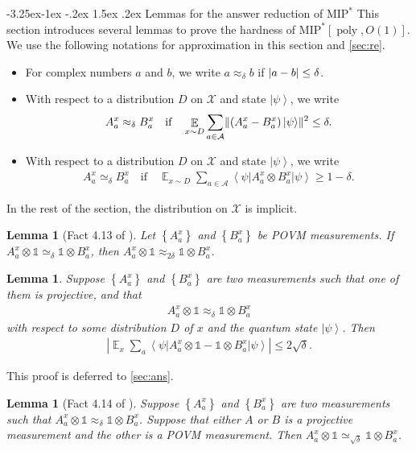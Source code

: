 \documentclass[11pt]{article}
\makeatletter
\renewcommand{\subsection}{\@startsection{subsection}{2}{\z@}%
             {-3.25ex\@plus -1ex \@minus -.2ex}%
             {1.5ex \@plus .2ex}%
             {\normalfont\large\scshape\bfseries}}
\theoremstyle{plain}
\newtheorem{lemma}[theorem]{Lemma}
\theoremstyle{definition}
\newcommand {\set} [1] {\ensuremath{ \left\lbrace #1 \right\rbrace }}
\DeclarePairedDelimiter{\norm}{\lVert}{\rVert}
\newcommand {\ab} [1] {\ensuremath{ \left| #1 \right| }}
\DeclarePairedDelimiter{\abs}{\lvert}{\rvert}
\newcommand {\bra} [1] {\ensuremath{ \left\langle #1 \right| }}
\newcommand {\ket} [1] {\ensuremath{ \left| #1 \right\rangle }}
\DeclareMathOperator*{\bigE}{\mathbb{E}}
\newcommand {\id} {\ensuremath{\mathds{1}}}
\newcommand{\poly} {\ensuremath{\operatorname{poly}}}
\newcommand{\x}{\otimes}
\newcommand{\calX}{\mathcal{X}}
\newcommand{\calA}{\mathcal{A}}
\newcommand{\appd}[1]{\approx_{#1}}
\newcommand{\1}{\mathbb{1}} %
\newcommand{\MIP}{\mathrm{MIP}}
\makeatother
\begin{document}
\subsection{Lemmas for the answer reduction of \texorpdfstring{$\MIP^\ast$}{MIP*}}
\label{sec:lemma_mip}
This section introduces several lemmas to prove the hardness of $\MIP^\ast[\poly,O(1)]$. 
We use the following notations for approximation in this section and \cref{sec:re}.
\begin{itemize}
\item For complex numbers $a$ and $b$, we write $a \appd{\delta} b$ if $\abs{a - b} \leq \delta$.
\item With respect to a distribution $D$ on $\calX$ and state $\ket{\psi}$, we write
\begin{align*}
	A^x_a \appd{\delta} B^x_a \quad \text{if} \quad \bigE_{x \sim D}\sum_{a \in \calA} \norm{ (A^x_a - B^x_a) \ket{\psi}}^2 \leq \delta.
\end{align*}
	\item With respect to a distribution $D$ on $\calX$ and state $\ket{\psi}$, we write
	\begin{align*}
		A^x_a \simeq_{\delta} B^x_a \quad \text{if} \quad \bigE_{x \sim D} \sum_{a \in \calA} \bra{\psi} A^x_a \x B^x_a \ket{\psi} \geq 1 - \delta.
	\end{align*}
\end{itemize}
In the rest of the section, the distribution on $\calX$ is implicit.
\begin{lemma}[Fact 4.13 of \cite{neexp}]
	\label{lm:consist_to_approx}
	Let $\set{A^x_a}$ and $\set{B^x_a}$ be POVM measurements.
	If $A^x_a \x \id \simeq_{\delta} \id \x B^x_a$, then $A^x_a \x \id \appd{2\delta} \id \x B^x_a$.
\end{lemma}
\begin{lemma} 
	\label{lm:close}
	Suppose $\set{A^x_a}$ and $\set{ B^x_a }$ are two measurements such that
	one of them is projective, and that 
	\begin{align*}
		A^x_a \x \id \appd{\delta} \id \x B^x_a
	\end{align*}
	with respect to some distribution $D$ of $x$ and the quantum state $\ket{\psi}$.
	Then
	\begin{align*}
		\ab{ \bigE_x \sum_a \bra{\psi} A^x_a \x \id - \id\x B^x_a \ket{\psi}} \leq  2 \sqrt{\delta}.
	\end{align*}
\end{lemma}
This proof is deferred to \cref{sec:ans}.
\begin{lemma}[Fact 4.14 of \cite{neexp}]
	\label{lm:convert}
	Suppose $\set{A^x_a}$ and $\set{ B^x_a }$ are two measurements such that 
	$A^x_a \x \id \appd{\delta} \id \x B^x_a$.
	Suppose that either $A$ or $B$ is a projective measurement and the other is a POVM measurement.
	Then $A^x_a \x \id \simeq_{\sqrt{\delta}} \id \x B^x_a$.
\end{lemma}
\end{document}
